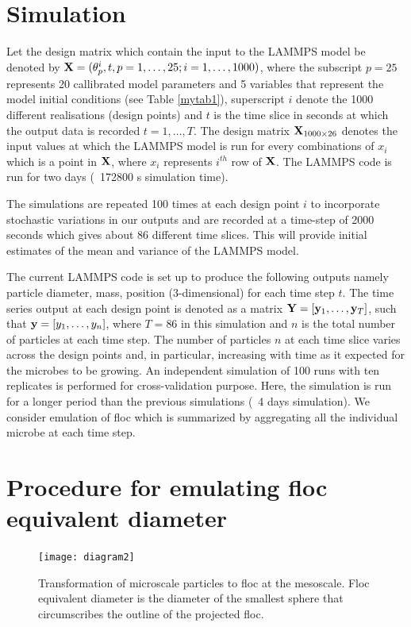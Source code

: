 \documentclass[12pt,titlepage]{report}
\newcommand{\bX}{{\bf X}}
\newcommand{\by}{{\bf y}}
\newcommand{\bY}{{\bf Y}}
\theoremstyle{definition}
\theoremstyle{remark}
\begin{document}
\section{Simulation}
Let the design matrix which contain the input to the LAMMPS model be denoted by $\bX=(\theta^i_p, t, p=1,\ldots,25; i=1,\ldots,1000)$, where the subscript $p=25$ represents 20 callibrated model parameters and 5 variables that represent the model initial conditions (see Table \ref{mytab1}), superscript $i$ denote the 1000 different realisations (design points) and $t$ is the time slice in seconds at which the output data is recorded $t=1,\ldots,T$. The design matrix $\bX_{1000 \times 26}$ denotes the input values at which the LAMMPS model is run for every combinations of $x_i$ which is a point in $\bX$, where $x_i$ represents $i^{th}$ row of $\bX$.  The LAMMPS code is run for two days (~172800 s simulation time). 

The simulations are repeated 100 times at each design point $i$ to incorporate stochastic variations in our outputs and are recorded at a time-step of 2000 seconds which gives about 86 different time slices. This will provide initial estimates of the mean and variance of the LAMMPS model.

The current LAMMPS code is set up to produce the following outputs namely particle diameter, mass, position (3-dimensional) for each time step $t$. The time series output at each design point is denoted as a matrix $\bY=[\by_1,\ldots,\by_T]$, such that $\by=[y_1,\ldots,y_n]$,  where $T=86$ in this simulation and $n$ is the total number of particles at each time step. The number of particles $n$ at each time slice varies across the design points and, in particular, increasing with time as it expected for the microbes to be growing. An independent simulation of 100 runs with ten replicates is performed for cross-validation purpose. Here, the simulation is run for a longer period than the previous simulations (~4 days simulation). 
We consider emulation of floc which is summarized by aggregating all the individual microbe at each time step. 

\section{Procedure for emulating floc equivalent diameter}
\begin{figure}[!ht] 
\texttt{[image: diagram2]}
\caption[]{Transformation of microscale particles to floc at the mesoscale. Floc equivalent diameter is the diameter of the smallest sphere that circumscribes the outline of the projected floc.}\label{diag2}
\end{figure}
\end{document}
